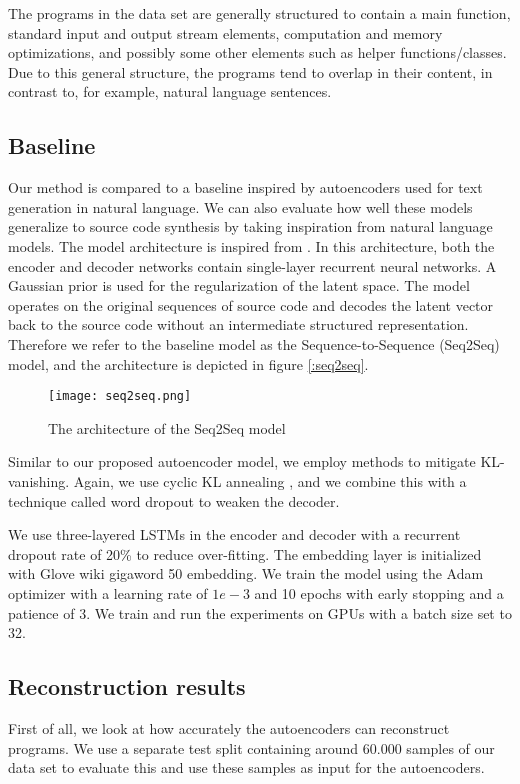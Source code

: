 The programs in the data set are generally structured to contain a main function, standard input and output stream elements, computation and memory optimizations, and possibly some other elements such as helper functions/classes. Due to this general structure, the programs tend to overlap in their content, in contrast to, for example, natural language sentences. 

\subsection{Baseline}
Our method is compared to a baseline inspired by autoencoders used for text generation in natural language. We can also evaluate how well these models generalize to source code synthesis by taking inspiration from natural language models. The model architecture is inspired from \cite{bowman2015generating}. In this architecture, both the encoder and decoder networks contain single-layer recurrent neural networks. A Gaussian prior is used for the regularization of the latent space. The model operates on the original sequences of source code and decodes the latent vector back to the source code without an intermediate structured representation. Therefore we refer to the baseline model as the Sequence-to-Sequence (Seq2Seq) model, and the architecture is depicted in figure \ref{:seq2seq}.

\begin{figure*}[ht!]
    \centering
    \texttt{[image: seq2seq.png]}
    \caption{The architecture of the Seq2Seq model}
    \label{fig:seq2seq}
\end{figure*}

Similar to our proposed autoencoder model, we employ methods to mitigate KL-vanishing. Again, we use cyclic KL annealing \cite{fu2019cyclical}, and we combine this with a technique called word dropout \cite{bowman2015generating} to weaken the decoder.

We use three-layered LSTMs in the encoder and decoder with a recurrent dropout rate of 20\% to reduce over-fitting. The embedding layer is initialized with Glove wiki gigaword 50 \cite{pennington2014glove} embedding. We train the model using the Adam optimizer \cite{kingma2014adam} with a learning rate of $1e-3$ and 10 epochs with early stopping and a patience of 3. We train and run the experiments on GPUs with a batch size set to 32.

\subsection{Reconstruction results}\label{sec:recon-results}
First of all, we look at how accurately the autoencoders can reconstruct programs. We use a separate test split containing around 60.000 samples of our data set to evaluate this and use these samples as input for the autoencoders. 



